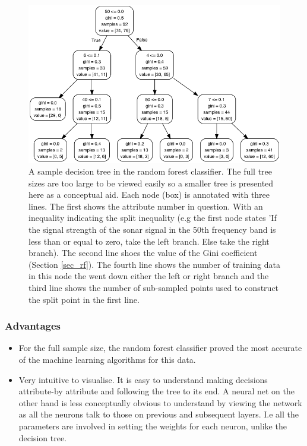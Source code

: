 \documentclass[10pt]{article}
\begin{document}
\begin{figure}
\begin{center}
\includegraphics[scale=0.6,angle=0,trim=3cm 0cm 0cm 0cm]{small_tree_9_0.png}
\caption{A sample decision tree in the random forest classifier. The full tree sizes are too large to be viewed easily so a smaller tree is presented here as a conceptual aid. Each node (box) is annotated with three lines. The first shows the attribute number in question. With an inequality indicating the split inequality (e.g the first node states 'If the signal strength of the sonar signal in the 50th frequency band is less than or equal to zero, take the left branch. Else take the right branch). The second line shoes the value of the Gini coefficient (Section \ref{sec_rf}). The fourth line shows the number of training data in this node the went down either the left or right branch and the third line shows the number of sub-sampled points used to construct the split point in the first line.}
\label{fig_dt}
\end{center}
\end{figure} 


\subsubsection{Advantages}
\begin{itemize} 

\item For the full sample size, the random forest classifier proved the most accurate of the machine learning algorithms for this data.

\item Very intuitive to visualise. It is easy to understand making decisions attribute-by attribute and following the tree to its end. A neural net on the other hand is less conceptually obvious to understand by viewing the network as all the neurons talk to those on previous and subsequent layers. I.e all the parameters are involved in setting the weights for each neuron, unlike the decision tree.

\end{itemize}
\end{document}
